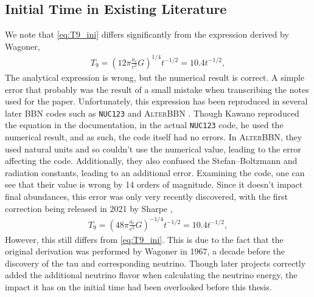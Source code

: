 \subsection{Initial Time in Existing Literature}
We note that \eqref{eq:T9_ini} differs significantly from the expression derived by Wagoner\cite{Wagoner67},
\begin{align}
    T_9=(12\pi\frac{a_r}{c^2}G)^{1/4}t^{-1/2}=10.4t^{-1/2},
\end{align}
The analytical expression is wrong, but the numerical result is correct. A simple error that probably was the result of a small mistake when transcribing the notes used for the paper. Unfortunately, this expression has been reproduced in several later BBN codes such as \texttt{NUC123}\cite{Kawano} and \textsc{AlterBBN} \cite{AlterBBN}. Though Kawano reproduced the equation in the documentation, in the actual \texttt{NUC123} code, he used the numerical result, and as such, the code itself had no errors. In \textsc{AlterBBN}, they used natural units and so couldn't use the numerical value, leading to the error affecting the code. Additionally, they also confused the Stefan–Boltzmann and radiation constants, leading to an additional error. Examining the code, one can see that their value is wrong by 14 orders of magnitude. %
Since it doesn't impact final abundances, this error was only very recently discovered, with the first correction being released in 2021 by Sharpe \cite{sharpe2021big},
\begin{align}
    T_9=(48\pi\frac{a_r}{c^2}G)^{-1/4}t^{-1/2}=10.4t^{-1/2},
\end{align}
However, this still differs from \eqref{eq:T9_ini}. This is due to the fact that the original derivation was performed by Wagoner in 1967, a decade before the discovery of the tau and corresponding neutrino. Though later projects correctly added the additional neutrino flavor when calculating the neutrino energy, the impact it has on the initial time had been overlooked before this thesis. 


